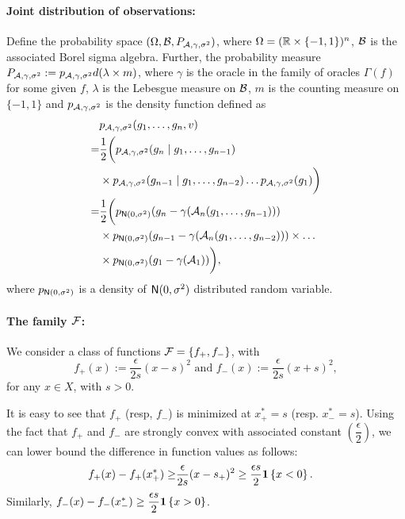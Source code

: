 \paragraph{Joint distribution of observations:}
Define the probability space $(\Omega, \mathcal{B}, P_{\mathcal{A},\gamma,\sigma^2})$, where $\Omega = (\mathbb{R}\times \{-1,1\})^n$, $\mathcal{B}$ is the associated Borel sigma algebra. Further, the probability measure $P_{\mathcal{A},\gamma,\sigma^2} := p_{\mathcal{A},\gamma,\sigma^2} d(\lambda \times m)$, where $\gamma$ is the oracle in the family of oracles $\Gamma(f)$ for some given $f$, $\lambda$ is the Lebesgue measure on $\mathcal{B}$, $m$ is the counting measure on $\{-1,1\}$ and $p_{\mathcal{A},\gamma,\sigma^2}$ is the density function defined as
\begin{align*}
&p_{\mathcal{A},\gamma,\sigma^2}(g_1, \ldots, g_n, v) \\
=& \dfrac{1}{2} \bigg(p_{\mathcal{A},\gamma,\sigma^2}(g_n \mid g_1,\ldots,g_{n-1}) \\
&\times p_{\mathcal{A},\gamma,\sigma^2}(g_{n-1} \mid g_1,\ldots,g_{n-2}) \ldots p_{\mathcal{A},\gamma,\sigma^2}(g_1)\bigg)\\
 = & \dfrac{1}{2} \bigg( p_{\mathsf{N}(0,\sigma^2)}(g_n - \gamma(\mathcal{A}_n(g_1,\ldots,g_{n-1})))\\
 &\times p_{\mathsf{N}(0,\sigma^2)}(g_{n-1} - \gamma(\mathcal{A}_n(g_1,\ldots,g_{n-2}))) \times \ldots \\
 &\times  p_{\mathsf{N}(0,\sigma^2)}(g_1 - \gamma(\mathcal{A}_1))\bigg),
\end{align*}
where $p_{\mathsf{N}(0,\sigma^2)}$ is a density of $\mathsf{N}(0,\sigma^2)$ distributed random variable.  


\paragraph{The family $\mathcal{F}$:}

We consider a class of functions $\mathcal{F} = \{f_+, f_-\}$, with 
\begin{equation*}
  f_+(x) := \dfrac{\epsilon}{2s} (x - s)^2 \text{ and } f_-(x) := \dfrac{\epsilon}{2s} (x + s)^2,
\end{equation*}
for any  $x \in X$, with $s>0$.

It is easy to see that $f_+$ (resp, $f_-$) is minimized at $x^*_+ = s$ (resp. $x^*_- = s$). 
Using the fact that $f_+$ and $f_-$ are strongly convex with associated constant $\left(\dfrac{\epsilon}{2}\right)$, we can lower bound the difference in function values as follows:
\begin{align}
  f_+(x) - f_+(x^*_+)
  \ge &  \dfrac{\epsilon}{2s} (x - s_+)^2 \ge  \dfrac{\epsilon s}{2}  \mathbf{1}\left\{x  < 0\right\}. \label{eq:fv-lb}
\end{align}
Similarly,   $f_-(x) - f_-(x^*_-) \ge  \dfrac{\epsilon s}{2}  \mathbf{1}\left\{x  >0\right\}$.

